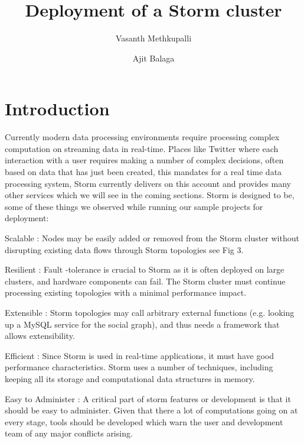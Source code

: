 \documentclass[9pt,twocolumn,twoside]{../../styles/osajnl}
\title{Deployment of a Storm cluster}
\author[1,*]{Vasanth Methkupalli}
\author[1,**]{Ajit Balaga}
\affil[1]{School of Informatics and Computing, Bloomington, IN 47408, U.S.A.}
\affil[*]{Corresponding authors: mvasanthiiit@gmail.com}
\affil[**]{Corresponding authors: ajit.balaga@gmail.com}
\begin{document}
\maketitle


\maketitle

\section{Introduction}
Currently modern data processing environments require processing
complex computation on streaming data in real-time. Places like
Twitter where each interaction with a user requires making a number of
complex decisions, often based on data that has just been created,
this mandates for a real time data processing system, Storm currently
delivers on this account and provides many other services which we
will see in the coming sections. Storm is designed to be, some of
these things we observed while running our sample projects for
deployment:

\begin{description}
\item Scalable : Nodes may be easily added or removed
  from the Storm cluster without disrupting existing data flows
  through Storm topologies see Fig 3.
\item Resilient : Fault -tolerance is crucial to Storm as it is often
  deployed on large clusters, and hardware components can fail.  The
  Storm cluster must continue processing existing topologies with a
  minimal performance impact.
\item Extensible : Storm topologies may call arbitrary external
  functions (e.g. looking up a MySQL service for the social graph),
  \cite{bronson2013tao} and thus needs a framework that allows
  extensibility.
\item  Efficient : Since Storm is used in
  real-time applications, it must have good performance
  characteristics. Storm uses a number of techniques, including
  keeping all its storage and computational data structures in memory.
\item Easy to Administer : A critical part of storm features or
  development is that it should be easy to administer. Given that
  there a lot of computations going on at every stage, tools should be
  developed which warn the user and development team of any major
  conflicts arising.
\end{description}
\end{document}
